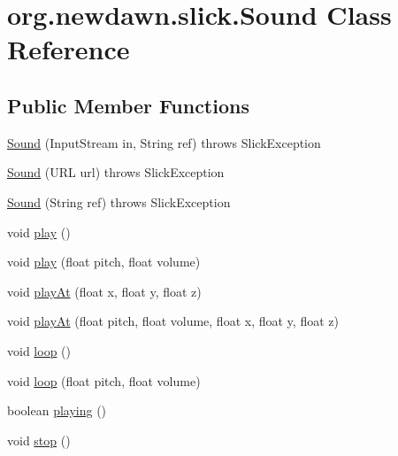 \hypertarget{classorg_1_1newdawn_1_1slick_1_1_sound}{}\section{org.\+newdawn.\+slick.\+Sound Class Reference}
\label{classorg_1_1newdawn_1_1slick_1_1_sound}
\subsection*{Public Member Functions}
\begin{DoxyCompactItemize}
\item 
\mbox{\hyperlink{classorg_1_1newdawn_1_1slick_1_1_sound_af9897c7ca26fa283c24b02a45e4b26a0}{Sound}} (Input\+Stream in, String ref)  throws Slick\+Exception 
\item 
\mbox{\hyperlink{classorg_1_1newdawn_1_1slick_1_1_sound_a20dcf700d3465e252a2bdfba4027f9f4}{Sound}} (U\+RL url)  throws Slick\+Exception 
\item 
\mbox{\hyperlink{classorg_1_1newdawn_1_1slick_1_1_sound_af6e8f8212cedf93b2ca0006bf453e39c}{Sound}} (String ref)  throws Slick\+Exception 
\item 
void \mbox{\hyperlink{classorg_1_1newdawn_1_1slick_1_1_sound_aed5db39a69e8ed57eb14053f7588ab90}{play}} ()
\item 
void \mbox{\hyperlink{classorg_1_1newdawn_1_1slick_1_1_sound_ad3baa12034e6998bdd534085edb21cdb}{play}} (float pitch, float volume)
\item 
void \mbox{\hyperlink{classorg_1_1newdawn_1_1slick_1_1_sound_aed55e68926087aee47c5cdd6b4447ffa}{play\+At}} (float x, float y, float z)
\item 
void \mbox{\hyperlink{classorg_1_1newdawn_1_1slick_1_1_sound_a5345a9e47718953ac1d9c15a4dfaefff}{play\+At}} (float pitch, float volume, float x, float y, float z)
\item 
void \mbox{\hyperlink{classorg_1_1newdawn_1_1slick_1_1_sound_a6642a989affb6089a72cd6ee5150a146}{loop}} ()
\item 
void \mbox{\hyperlink{classorg_1_1newdawn_1_1slick_1_1_sound_a9babdfc6029478c514f5155b0fb53d42}{loop}} (float pitch, float volume)
\item 
boolean \mbox{\hyperlink{classorg_1_1newdawn_1_1slick_1_1_sound_ad5eea07a2c542c26890a497fb21bcb34}{playing}} ()
\item 
void \mbox{\hyperlink{classorg_1_1newdawn_1_1slick_1_1_sound_a92f5c4af5d3a5a0b26dcf3c6ebb93433}{stop}} ()
\end{DoxyCompactItemize}
